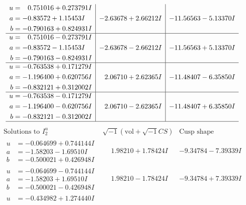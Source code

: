 \documentclass[1p]{elsarticle_modified}
\theoremstyle{definition}
\newcommand{\I}{\sqrt{-1}}
\begin{document}
$$\begin{array}{c|c|c}
\begin{aligned}
u &= \phantom{-}0.751016 + 0.273791 I \\
a &= -0.83572 + 1.15453 I \\
b &= -0.790163 + 0.824931 I\end{aligned}
 & -2.63678 + 2.66212 I & -11.56563 - 5.13370 I \\ \hline\begin{aligned}
u &= \phantom{-}0.751016 - 0.273791 I \\
a &= -0.83572 - 1.15453 I \\
b &= -0.790163 - 0.824931 I\end{aligned}
 & -2.63678 - 2.66212 I & -11.56563 + 5.13370 I \\ \hline\begin{aligned}
u &= -0.763538 + 0.171279 I \\
a &= -1.196400 + 0.620756 I \\
b &= -0.832121 + 0.312002 I\end{aligned}
 & \phantom{-}2.06710 + 2.62365 I & -11.48407 - 6.35850 I \\ \hline\begin{aligned}
u &= -0.763538 - 0.171279 I \\
a &= -1.196400 - 0.620756 I \\
b &= -0.832121 - 0.312002 I\end{aligned}
 & \phantom{-}2.06710 - 2.62365 I & -11.48407 + 6.35850 I\\
 \hline 
 \end{array}$$\newpage$$\begin{array}{c|c|c}  
\text{Solutions to }I^u_{2}& \I (\text{vol} + \sqrt{-1}CS) & \text{Cusp shape}\\
 \hline 
\begin{aligned}
u &= -0.064699 + 0.744144 I \\
a &= -1.58203 - 1.69510 I \\
b &= -0.500021 + 0.426948 I\end{aligned}
 & \phantom{-}1.98210 + 1.78424 I & -9.34784 - 7.39339 I \\ \hline\begin{aligned}
u &= -0.064699 - 0.744144 I \\
a &= -1.58203 + 1.69510 I \\
b &= -0.500021 - 0.426948 I\end{aligned}
 & \phantom{-}1.98210 - 1.78424 I & -9.34784 + 7.39339 I \\ \hline\begin{aligned}
u &= -0.434982 + 1.274440 I \\

\end{aligned}
\end{array}$$
\end{document}
